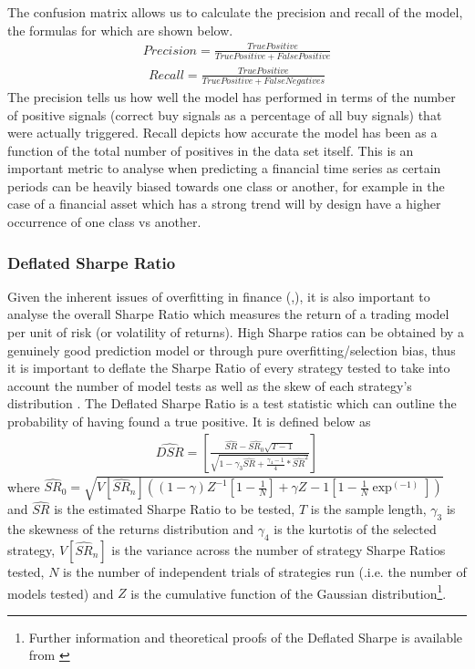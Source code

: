 \documentclass[11pt]{article}
\begin{document}
The confusion matrix allows us to calculate the precision and recall of the model, the formulas for which are shown below.
\begin{align}
Precision = \frac{True Positive}{True Positive + False Positive} 
\end{align}
\begin{align}
Recall = \frac{True Positive}{True Positive + False Negatives} 
\end{align}
The precision tells us how well the model has performed in terms of the number of positive signals (correct buy signals as a percentage of all buy signals) that were actually triggered. Recall depicts how accurate the model has been as a function of the total number of positives in the data set itself. This is an important metric to analyse when predicting a financial time series as certain periods can be heavily biased towards one class or another, for example in the case of a financial asset which has a strong trend will by design have a higher occurrence of one class vs another.

\subsubsection{Deflated Sharpe Ratio}
Given the inherent issues of overfitting in finance (\cite{Arnott2018},\cite{LopezdePrado2018}), it is also important to analyse the overall Sharpe Ratio \cite{Sharpe2009} which measures the return of a trading model per unit of risk (or volatility of returns). \newline High Sharpe ratios can be obtained by a genuinely good prediction model or through pure overfitting/selection bias, thus it is important to deflate the Sharpe Ratio of every strategy tested to take into account the number of model tests as well as the skew of each strategy's distribution \cite{Bailey2014}. 
The Deflated Sharpe Ratio is a test statistic which can outline the probability of having found a true positive. It is defined below as
\begin{align}
\widehat{DSR} = \left[
		 				\frac{\widehat{SR}-\widehat{SR_{0}}\sqrt{T-1}}
						{\sqrt{1-\gamma_{3}\widehat{SR} + \frac{\gamma_{4} - 1}{4}*\widehat{SR}^{2}}} 
				 \right]
\end{align}
where $\widehat{SR}_{0} = \sqrt{V\left[\widehat{SR}_{n}\right] 
						\left(      	
							\left(1- \gamma\right) Z^{-1} \left[ 1- \frac{1}{N}\right] + \gamma Z^{}-1 \left[ 1-\frac{1}{N}\exp^(-1) \right] 
						 \right)}$
and $\widehat{SR}$ is the estimated Sharpe Ratio to be tested, $T$ is the sample length, $\gamma_{3}$ is the skewness of the returns distribution and $\gamma_{4}$ is the kurtotis of the selected strategy,  $V\left[\widehat{SR}_{n}\right]$ is the variance across the number of strategy Sharpe Ratios tested, $N$ is the number of independent trials of strategies run (.i.e. the number of models tested) and $Z$ is the cumulative function of the Gaussian distribution\footnote{Further information and theoretical proofs of the Deflated Sharpe is available from \cite{Bailey2014}}.  
\end{document}
